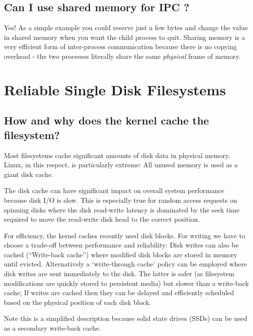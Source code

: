 \subsection{Can I use shared memory for IPC ?}\label{can-i-use-shared-memory-for-ipc}

Yes! As a simple example you could reserve just a few bytes and change the value in shared memory when you want the child process to quit. Sharing memory is a very efficient form of inter-process communication because there is no copying overhead - the two processes literally share the same \emph{physical} frame of memory.

\section{Reliable Single Disk Filesystems}\label{reliable-single-disk-filesystems}

\subsection{How and why does the kernel cache the filesystem?}\label{how-and-why-does-the-kernel-cache-the-filesystem}

Most filesystems cache significant amounts of disk data in physical memory. Linux, in this respect, is particularly extreme: All unused memory is used as a giant disk cache.

The disk cache can have significant impact on overall system performance because disk I/O is slow. This is especially true for random access requests on spinning disks where the disk read-write latency is dominated by the seek time required to move the read-write disk head to the correct position.

For efficiency, the kernel caches recently used disk blocks. For writing we have to choose a trade-off between performance and reliability: Disk writes can also be cached (``Write-back cache'') where modified disk blocks are stored in memory until evicted. Alternatively a `write-through cache' policy can be employed where disk writes are sent immediately to the disk. The latter is safer (as filesystem modifications are quickly stored to persistent media) but slower than a write-back cache; If writes are cached then they can be delayed and efficiently scheduled based on the physical position of each disk block.

Note this is a simplified description because solid state drives (SSDs) can be used as a secondary write-back cache.

